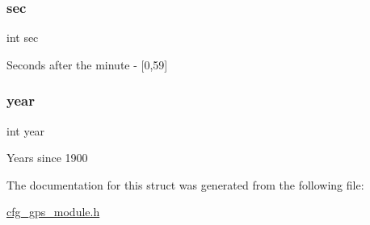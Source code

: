 \subsubsection{\texorpdfstring{sec}{sec}}
{\footnotesize\ttfamily int sec}

Seconds after the minute -\/ \mbox{[}0,59\mbox{]} \mbox{\label{struct__nmea_t_i_m_e_abeac221e38b7b9ce7df8722c842bf671}} 
\subsubsection{\texorpdfstring{year}{year}}
{\footnotesize\ttfamily int year}

Years since 1900 

The documentation for this struct was generated from the following file\+:\begin{DoxyCompactItemize}
\item 
\hyperlink{cfg__gps__module_8h}{cfg\+\_\+gps\+\_\+module.\+h}\end{DoxyCompactItemize}
